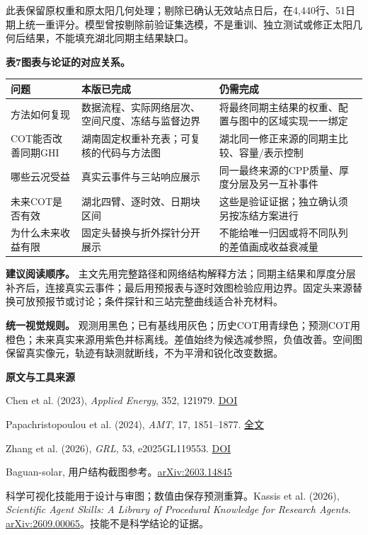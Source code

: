 \documentclass[UTF8,a4paper,10pt,fontset=none]{ctexart}
\begin{document}
{\small\color{muted}此表保留原权重和原太阳几何处理；剔除已确认无效站点日后，在4,440行、51日期上统一重评分。模型曾按剔除前验证集选模，不是重训、独立测试或修正太阳几何后结果，不能填充湖北同期主结果缺口。\par}
\clearpage{}\par{}\par\vspace{4mm}
\textbf{表7\quad 图表与论证的对应关系。}\par
\begin{tabularx}{\linewidth}{p{33mm}YY}\toprule
问题 & 本版已完成 & 仍需完成\\\midrule
方法如何复现 & 数据流程、实际网络层次、空间尺度、冻结与监督边界 & 将最终同期主结果的权重、配置与图中的区域实现一一绑定\\
COT能否改善同期GHI & 湖南固定权重补充表；可复核的代码与方法图 & 湖北同一修正来源的同期主比较、容量/表示控制\\
哪些云况受益 & 真实云事件与三站响应展示 & 同一最终来源的CPP质量、厚度分层及另一互补事件\\
未来COT是否有效 & 湖北四臂、逐时效、日期块区间 & 这些是验证证据；独立确认须另按冻结方案进行\\
为什么未来收益有限 & 固定头替换与折外探针分开展示 & 不能给唯一归因或将不同队列的差值画成收益衰减量\\\bottomrule\end{tabularx}
\textbf{建议阅读顺序。} 主文先用完整路径和网络结构解释方法；同期主结果和厚度分层补齐后，连接真实云事件；最后用预报表与逐时效图检验应用边界。固定头来源替换可放预报节或讨论；条件探针和三站完整曲线适合补充材料。

\textbf{统一视觉规则。} 观测用黑色；已有基线用灰色；历史COT用青绿色；预测COT用橙色；未来真实来源用紫色并标离线。差值始终为候选减参照，负值改善。空间图保留真实像元，轨迹有缺测就断线，不为平滑和锐化改变数据。

\vspace{3mm}\textbf{原文与工具来源}\par
{\small
Chen et al. (2023), \textit{Applied Energy}, 352, 121979. \href{https://doi.org/10.1016/j.apenergy.2023.121979}{DOI}\par
Papachristopoulou et al. (2024), \textit{AMT}, 17, 1851--1877. \href{https://amt.copernicus.org/articles/17/1851/2024/}{全文}\par
Zhang et al. (2026), \textit{GRL}, 53, e2025GL119553. \href{https://doi.org/10.1029/2025GL119553}{DOI}\par
Baguan-solar, 用户结构截图参考。\href{https://arxiv.org/abs/2603.14845}{arXiv:2603.14845}\par
科学可视化技能用于设计与审图；数值由保存预测重算。Kassis et al. (2026), \textit{Scientific Agent Skills: A Library of Procedural Knowledge for Research Agents}. \href{https://arxiv.org/abs/2609.00065}{arXiv:2609.00065}。技能不是科学结论的证据。\par}
\end{document}
